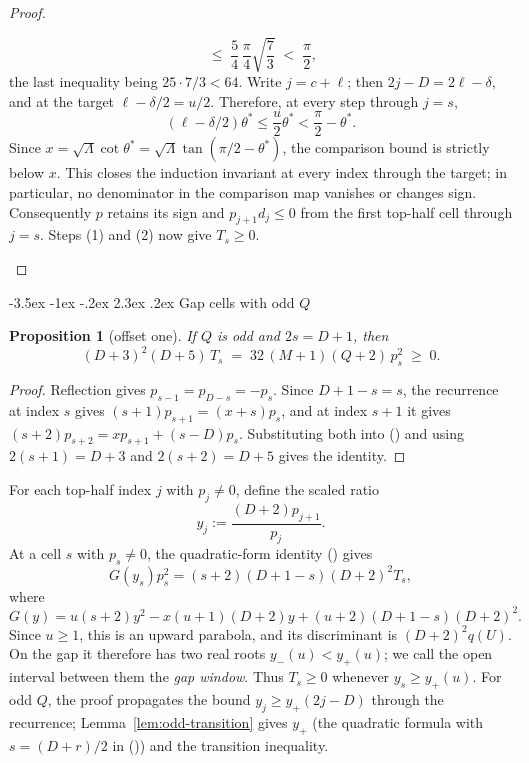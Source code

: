 \documentclass[twoside,10pt]{article}
\makeatletter
\numberwithin{equation}{section}
\theoremstyle{slbody}
\newtheorem{proposition}[theorem]{Proposition}
\theoremstyle{definition}
\theoremstyle{remark}
\numberwithin{theorem}{section}
\renewcommand{\eqref}[1]{%
  \textup{{\normalfont(\oldstylenums{\ref{#1}}}\normalfont)}}
\renewcommand{\section}{%
  \@startsection{section}{1}{\z@}%
    {-3.5ex \@plus -1ex \@minus -.2ex}%
    {2.3ex \@plus .2ex}%
    {\normalfont\large\bfseries}}
\makeatother
\begin{document}
\begin{proof}
\begin{enumerate}
\[    \;\le\; \frac54\,\frac{\pi}{4}\sqrt{\frac73}
    \;<\; \frac\pi2 ,
  \]
  the last inequality being $25\cdot7/3<64$.
  Write $j=c+\ell$; then $2j-D=2\ell-\delta$, and at the target
  $\ell-\delta/2=u/2$.  Therefore, at every step through $j=s$,
  \[
    (\ell-\delta/2)\theta^*\le\frac u2\theta^*
       <\frac\pi2-\theta^* .
  \]
  Since
  $x=\sqrt\Lambda\cot\theta^*
     =\sqrt\Lambda\tan(\pi/2-\theta^*)$, the comparison bound is strictly
  below $x$.  This closes the induction invariant at every index through
  the target; in particular, no denominator in the comparison map vanishes
  or changes sign.  Consequently
  $p$ retains its sign and $p_{j+1}d_j\le0$ from the first top-half cell
  through $j=s$.  Steps (1) and (2) now give $T_s\ge0$.
  \qedhere
\end{enumerate}
\end{proof}

\section{Gap cells with odd \texorpdfstring{$Q$}{Q}}\label{sec:oddmin}

\begin{proposition}[offset one]\label{prop:odd-one}
If $Q$ is odd and $2s=D+1$, then
\[
 (D+3)^2(D+5)\,T_s \;=\; 32\,(M+1)(Q+2)\,p_s^2 \;\ge\; 0 .
\]
\end{proposition}

\begin{proof}
Reflection gives $p_{s-1}=p_{D-s}=-p_s$.  Since $D+1-s=s$, the recurrence
at index $s$ gives $(s+1)p_{s+1}=(x+s)p_s$, and at index $s+1$ it gives
$(s+2)p_{s+2}=xp_{s+1}+(s-D)p_s$.  Substituting both into \eqref{eq:Tdef}
and using $2(s+1)=D+3$ and $2(s+2)=D+5$ gives the identity.
\end{proof}

For each top-half index $j$ with $p_j\ne0$, define the scaled ratio
\[
 y_j:=\frac{(D+2)p_{j+1}}{p_j}.
\]
At a cell $s$ with $p_s\ne0$, the quadratic-form identity
\eqref{eq:qform} gives
\[
 G(y_s)p_s^2=(s+2)(D+1-s)(D+2)^2T_s,
\]
where
\begin{equation}\label{eq:window}
 G(y)=u(s+2)y^2-x(u+1)(D+2)y
       +(u+2)(D+1-s)(D+2)^2.
\end{equation}
Since $u\ge1$, this is an upward parabola, and its discriminant is
$(D+2)^2q(U)$.  On the gap it therefore has two real roots
$y_-(u)<y_+(u)$; we call the open interval between them the
\emph{gap window}.  Thus $T_s\ge0$ whenever $y_s\ge y_+(u)$.  For odd $Q$, the proof propagates
the bound $y_j\ge y_+(2j-D)$ through the recurrence;
Lemma~\ref{lem:odd-transition} gives $y_+$ (the quadratic formula with
$s=(D+r)/2$ in \eqref{eq:window}) and the transition inequality.
\end{document}
